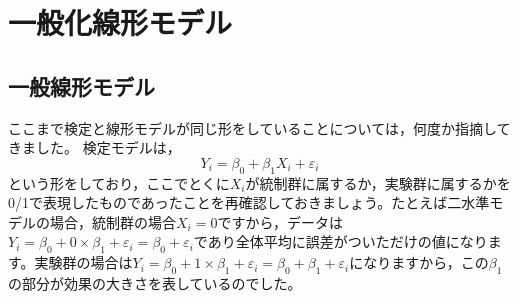 \documentclass{ltjsbook}
\begin{document}
\chapter{一般化線形モデル}
\VerbatimFootnotes
\label{x24_linearModel}
\section{一般線形モデル}
ここまで検定と線形モデルが同じ形をしていることについては，何度か指摘してきました。
検定モデルは，
\[ Y_{i} = \beta_0 + \beta_1 X_{i} + \varepsilon_{i}\]
という形をしており，ここでとくに$X_{i}$が統制群に属するか，実験群に属するかを0/1で表現したものであったことを再確認しておきましょう。たとえば二水準モデルの場合，統制群の場合$X_i=0$ですから，データは$Y_i = \beta_0 + 0\times \beta_1+ \varepsilon_{i} = \beta_0+ \varepsilon_{i}$であり全体平均に誤差がついただけの値になります。実験群の場合は$Y_i = \beta_0 + 1 \times \beta_1 + \varepsilon_{i}= \beta_0 + \beta_1+ \varepsilon_{i}$になりますから，この$\beta_1$の部分が効果の大きさを表しているのでした。
\end{document}
